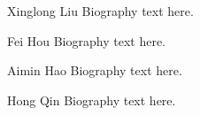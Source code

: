 \documentclass[journal]{IEEEtran}
\begin{document}





%

\begin{IEEEbiography}{Xinglong Liu}
Biography text here.
\end{IEEEbiography}

\begin{IEEEbiographynophoto}{Fei Hou}
Biography text here.
\end{IEEEbiographynophoto}


\begin{IEEEbiographynophoto}{Aimin Hao}
Biography text here.
\end{IEEEbiographynophoto}

\begin{IEEEbiographynophoto}{Hong Qin}
Biography text here.
\end{IEEEbiographynophoto}






\end{document}
